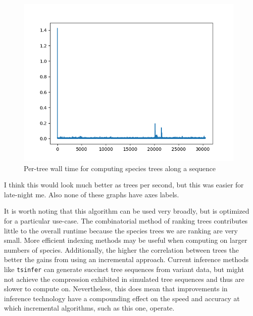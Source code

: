 \documentclass{article}
\newcommand{\tsinfer}{{\texttt{tsinfer}}}
\begin{document}
\begin{figure}[H]
    \includegraphics[scale=0.75]{incremental_times.png}
    \centering
    \caption{Per-tree wall time for computing species trees along a sequence}
    \label{fig:incremental_times}
\end{figure}

I think this would look much better as trees per second, but this was easier
for late-night me. Also none of these graphs have axes labels.

It is worth noting that this algorithm can be used very broadly, but is optimized
for a particular use-case. The combinatorial method of ranking trees contributes
little to the overall runtime because the species trees we are ranking are very
small. More efficient indexing methods may be useful when computing on larger
numbers of species. Additionally, the higher the correlation between trees the
better the gains from using an incremental approach. Current inference methods
like \tsinfer{} can generate succinct tree sequences from variant data, but might
not achieve the compression exhibited in simulated tree sequences and thus
are slower to compute on. Nevertheless, this does mean that improvements in
inference technology have a compounding effect on the speed and accuracy
at which incremental algorithms, such as this one, operate.
\end{document}
